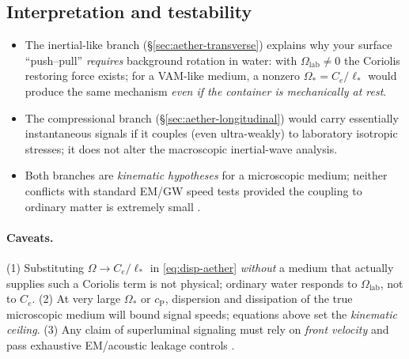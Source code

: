 \documentclass[12pt]{article}
\begin{document}
\subsection{Interpretation and testability}
\begin{itemize}
\item The inertial-like branch (\S\ref{sec:aether-transverse}) explains why your surface ``push--pull'' \emph{requires} background rotation in water: with $\Omega_{\text{lab}}\neq 0$ the Coriolis restoring force exists; for a VAM-like medium, a nonzero $\Omega_*=C_e/\ell_*$ would produce the same mechanism \emph{even if the container is mechanically at rest}.
\item The compressional branch (\S\ref{sec:aether-longitudinal}) would carry essentially instantaneous signals if it couples (even ultra-weakly) to laboratory isotropic stresses; it does not alter the macroscopic inertial-wave analysis.
\item Both branches are \emph{kinematic hypotheses} for a microscopic medium; neither conflicts with standard EM/GW speed tests provided the coupling to ordinary matter is extremely small \cite{Abbott2017PRL,Abbott2017ApJL}.
\end{itemize}

\paragraph{Caveats.}
(1) Substituting $\Omega\to C_e/\ell_*$ in \eqref{eq:disp-aether} \emph{without} a medium that actually supplies such a Coriolis term is not physical; ordinary water responds to $\Omega_{\text{lab}}$, not to $C_e$. (2) At very large $\Omega_*$ or $c_{\mathrm{P}}$, dispersion and dissipation of the true microscopic medium will bound signal speeds; equations above set the \emph{kinematic ceiling}. (3) Any claim of superluminal signaling must rely on \emph{front velocity} and pass exhaustive EM/acoustic leakage controls \cite{Brillouin1960}.
\end{document}
